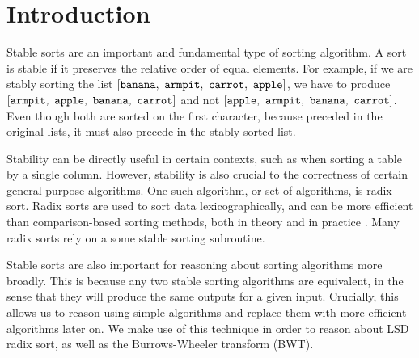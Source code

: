 \documentclass[sigplan,10pt,anonymous,review]{thesis}
\begin{document}


\maketitle

\section{Introduction}
\label{sec:intro}

Stable sorts are an important and fundamental type of sorting
algorithm. A sort is stable if it preserves the relative order of
equal elements. For example, if we are stably sorting the list
$[\var{banana},\ \allowbreak\var{armpit},\ \allowbreak\var{carrot},\ \allowbreak\var{apple}]$,
we have to produce
$[\var{armpit},\ \allowbreak\var{apple},\ \allowbreak\var{banana},\ \allowbreak\var{carrot}]$
and not
$[\var{apple},\ \allowbreak\var{armpit},\ \allowbreak\var{banana},\ \allowbreak\var{carrot}]$.
Even though both are sorted on the first character, because
 preceded  in the original lists, it must also
precede  in the stably sorted list.

Stability can be directly useful in certain contexts, such as when
sorting a table by a single column. However, stability is also crucial
to the correctness of certain general-purpose algorithms. One such
algorithm, or set of algorithms, is radix sort. Radix sorts are used
to sort data lexicographically, and can be more efficient than
comparison-based sorting methods, both in theory and in practice
\cite{McIlroy93,Bentley:1997:FAS:314161.314321,10.1007/978-3-540-89097-3_3}.
Many radix sorts rely on a some stable sorting subroutine.

Stable sorts are also important for reasoning about sorting algorithms
more broadly. This is because any two stable sorting algorithms are
equivalent, in the sense that they will produce the same outputs for a
given input. Crucially, this allows us to reason using simple
algorithms and replace them with more efficient algorithms later on.
We make use of this technique in order to reason about LSD radix sort,
as well as the Burrows-Wheeler transform (BWT).
\end{document}
